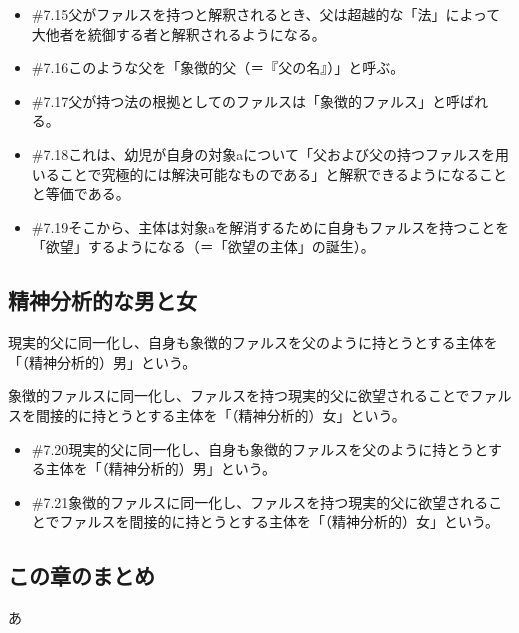\begin{note}{}
  \begin{itemize}
    \tightlist
    \item{\#7.15}父がファルスを持つと解釈されるとき、父は超越的な「法」によって大他者を統御する者と解釈されるようになる。
    \item{\#7.16}このような父を「象徴的父（＝『父の名』）」と呼ぶ。
    \item{\#7.17}父が持つ法の根拠としてのファルスは「象徴的ファルス」と呼ばれる。
    \item{\#7.18}これは、幼児が自身の対象aについて「父および父の持つファルスを用いることで究極的には解決可能なものである」と解釈できるようになることと等価である。
    \item{\#7.19}そこから、主体は対象aを解消するために自身もファルスを持つことを「欲望」するようになる（＝「欲望の主体」の誕生）。
  \end{itemize}
\end{note}

\subsection{精神分析的な男と女}\label{ux7cbeux795eux5206ux6790ux7684ux306aux7537ux3068ux5973}

現実的父に同一化し、自身も象徴的ファルスを父のように持とうとする主体を「（精神分析的）男」という。

象徴的ファルスに同一化し、ファルスを持つ現実的父に欲望されることでファルスを間接的に持とうとする主体を「（精神分析的）女」という。

\begin{note}{}
  \begin{itemize}
    \tightlist
    \item{\#7.20}現実的父に同一化し、自身も象徴的ファルスを父のように持とうとする主体を「（精神分析的）男」という。
    \item{\#7.21}象徴的ファルスに同一化し、ファルスを持つ現実的父に欲望されることでファルスを間接的に持とうとする主体を「（精神分析的）女」という。
  \end{itemize}
\end{note}

\subsection{この章のまとめ}\label{ux3053ux306eux7ae0ux306eux307eux3068ux3081}

あ
